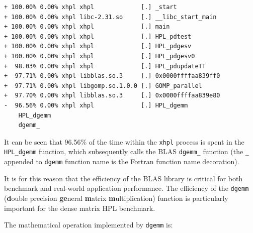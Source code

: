 \documentclass{report}
\begin{document}
\lstset{style=term}
\begin{lstlisting}
+ 100.00% 0.00% xhpl xhpl             [.] _start                                                                                        
+ 100.00% 0.00% xhpl libc-2.31.so     [.] __libc_start_main                                                                             
+ 100.00% 0.00% xhpl xhpl             [.] main                                                                                          
+ 100.00% 0.00% xhpl xhpl             [.] HPL_pdtest                                                                                    
+ 100.00% 0.00% xhpl xhpl             [.] HPL_pdgesv                                                                                    
+ 100.00% 0.00% xhpl xhpl             [.] HPL_pdgesv0                                                                                   
+  98.03% 0.00% xhpl xhpl             [.] HPL_pdupdateTT                                                                                
+  97.71% 0.00% xhpl libblas.so.3     [.] 0x0000ffffaa839ff0                                                                            
+  97.71% 0.00% xhpl libgomp.so.1.0.0 [.] GOMP_parallel                                                                                 
+  97.70% 0.00% xhpl libblas.so.3     [.] 0x0000ffffaa839e80                                                                            
-  96.56% 0.00% xhpl xhpl             [.] HPL_dgemm                                                                                     
    HPL_dgemm                                                                                                                                           
    dgemm_            
\end{lstlisting}

It can be seen that 96.56\% of the time within the \verb|xhpl| process is spent in the \verb|HPL_dgemm| function, which subsequently calls the BLAS \verb|dgemm_| function (the \verb|_| appended to \verb|dgemm| function name is the Fortran function name decoration).
 
It is for this reason that the efficiency of the BLAS library is critical for both benchmark and real-world application performance. The efficiency of the \verb|dgemm| (\textbf{d}ouble precision \textbf{ge}neral \textbf{m}atrix \textbf{m}ultiplication) function is particularly important for the dense matrix HPL benchmark.

The mathematical operation implemented by \verb|dgemm| is:
\end{document}
